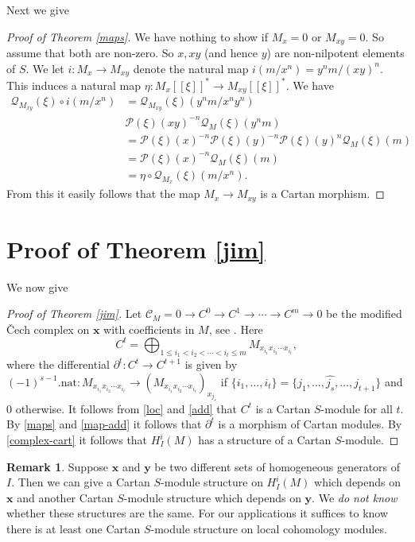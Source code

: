 \documentclass{amsart}
\newcommand{\yb}{\mathbf{y} }
\newcommand{\Pc}{\mathcal{P} }
\newcommand{\Qc}{\mathcal{Q} }
\newcommand{\xb}{\mathbf{x} }
\newcommand{\rt}{\rightarrow}
\newcommand{\wh}{\widehat }
\theoremstyle{plain}
\theoremstyle{definition}
\newtheorem{remark}[theorem]{Remark}
\theoremstyle{remark}
\begin{document}
Next we give
\begin{proof}[Proof of Theorem \ref{maps}]
We have nothing to show if $M_x = 0$ or $M_{xy} = 0$. So assume that both are non-zero. So $x, xy$ (and hence $y$) are non-nilpotent elements of $S$.
We let $i \colon M_x \rt M_{xy}$ denote the natural map $i(m/x^n) = y^nm/(xy)^n$. This induces a natural map $\eta \colon M_x[[\xi]]^* \rt M_{xy}[[\xi]]^*$.
We have
\begin{align*}
  \Qc_{M_{xy}}(\xi)\circ i(m/x^n) &=  \Qc_{M_{xy}}(\xi)(y^nm/x^ny^n) \\
  &\Pc(\xi)(xy)^{-n}\Qc_M(\xi)(y^nm) \\
   &= \Pc(\xi)(x)^{-n}\Pc(\xi)(y)^{-n}\Pc(\xi)(y)^{n}\Qc_M(\xi)(m) \\
   &=  \Pc(\xi)(x)^{-n}\Qc_M(\xi)(m) \\
   &= \eta\circ\Qc_{M_x}(\xi)(m/x^n).
\end{align*}
From this it easily follows that the map $M_x \rt M_{xy}$ is a Cartan morphism.
\end{proof}
\section{Proof of Theorem \ref{jim}}
We now give
\begin{proof}[Proof of Theorem \ref{jim}]
Let $\mathcal{C}_M = 0 \rt C^0 \rt C^1 \rt \cdots \rt C^m \rt 0$ be the modified \v{C}ech complex on $\xb$ with coefficients in $M$, see \cite[5.1.5]{bs}. Here
$$ C^t = \bigoplus_{1 \leq i_1< i_2 < \cdots<i_t \leq m}M_{x_{i_1}x_{i_2}\cdots x_{i_t}},$$
where the differential $\partial^t \colon C^t \rt C^{t+1}$ is given by \\  $(-1)^{s-1}.\text{nat}\colon M_{x_{i_1}x_{i_2}\cdots x_{i_t}} \rt (M_{x_{i_1}x_{i_2}\cdots x_{i_t}})_{x_{j_s}}$ if
$\{ i_1, \ldots, i_t \} = \{ j_1, \ldots, \wh{j_s}, \ldots, j_{t+1} \}$ and $0$ otherwise. It follows from \ref{loc} and \ref{add} that $C^t$ is a Cartan $S$-module for all $t$. By \ref{maps} and \ref{map-add} it follows that $\partial^t$ is a morphism of Cartan modules. By \ref{complex-cart} it follows that $H^i_I(M)$ has a structure of a Cartan $S$-module.
\end{proof}

\begin{remark}
Suppose $\xb$ and $\yb$ be two different sets of homogeneous generators of $I$. Then  we can give a Cartan $S$-module structure on $H^i_I(M)$ which depends on $\xb$ and another Cartan $S$-module structure which depends on $\yb$. We \emph{do not know} whether these structures are the same. For our applications it suffices to know there is at least one Cartan $S$-module structure on local cohomology modules.
\end{remark}
\end{document}
